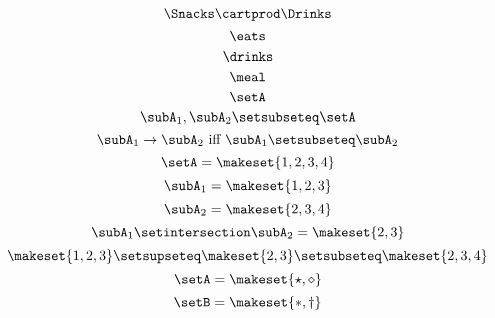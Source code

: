 {\begin{forslides}
        \begin{equation}
            \label{eq:prod-slides-9}
            \Snacks \cartprod \Drinks
        \end{equation}
        \begin{equation}
            \label{eq:prod-slides-10}
            \eats
        \end{equation}
        \begin{equation}
            \label{eq:prod-slides-11}
            \drinks
        \end{equation}
        \begin{equation}
            \label{eq:prod-slides-12}
            \meal
        \end{equation}
        \begin{equation}
            \label{eq:prod-slides-13}
            \setA
        \end{equation}
        \begin{equation}
            \label{eq:prod-slides-14}
            \subA_1, \subA_2 \setsubseteq \setA
        \end{equation}
        \begin{equation}
            \label{eq:prod-slides-15}
            \subA_1 \to \subA_2 \text{ iff } \subA_1 \setsubseteq \subA_2
        \end{equation}
        \begin{equation}
            \label{eq:prod-slides-16}
            \setA = \makeset{ 1, 2, 3, 4 }
        \end{equation}
        \begin{equation}
            \label{eq:prod-slides-17}
            \subA_1 = \makeset{ 1, 2, 3 }
        \end{equation}
        \begin{equation}
            \label{eq:prod-slides-18}
            \subA_2 = \makeset{2, 3, 4 }
        \end{equation}
        \begin{equation}
            \label{eq:prod-slides-19}
            \subA_1 \setintersection \subA_2 = \makeset{2, 3 }
        \end{equation}
        \begin{equation}
            \label{eq:prod-slides-20}
            \makeset{ 1, 2, 3 } \setsupseteq \makeset{2, 3 } \setsubseteq \makeset{2, 3, 4 }
        \end{equation}
        \begin{equation}
            \label{eq:coprod-slides-1}
            \setA=\makeset{\star, \diamond}
        \end{equation}
        \begin{equation}
            \label{eq:coprod-slides-2}
            \setB=\makeset{\ast, \dagger}
        \end{equation}
    \end{forslides}
}


